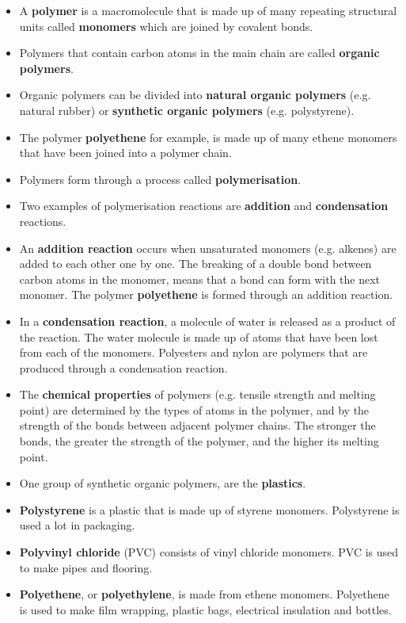 \begin{itemize}
\item{A \textbf{polymer} is a macromolecule that is made up of many repeating structural units called \textbf{monomers} which are joined by covalent bonds.}
\item{Polymers that contain carbon atoms in the main chain are called \textbf{organic polymers}.}
\item{Organic polymers can be divided into \textbf{natural organic polymers} (e.g. natural rubber) or \textbf{synthetic organic polymers} (e.g. polystyrene).}
\item{The polymer \textbf{polyethene} for example, is made up of many ethene monomers that have been joined into a polymer chain.}
\item{Polymers form through a process called \textbf{polymerisation}.}
\item{Two examples of polymerisation reactions are \textbf{addition} and \textbf{condensation} reactions.}
\item{An \textbf{addition reaction} occurs when unsaturated monomers (e.g. alkenes) are added to each other one by one. The breaking of a double bond between carbon atoms in the monomer, means that a bond can form with the next monomer. The polymer \textbf{polyethene} is formed through an addition reaction.}
\item{In a \textbf{condensation reaction}, a molecule of water is released as a product of the reaction. The water molecule is made up of atoms that have been lost from each of the monomers. Polyesters and nylon are polymers that are produced through a condensation reaction.}
\item{The \textbf{chemical properties} of polymers (e.g. tensile strength and melting point) are determined by the types of atoms in the polymer, and by the strength of the bonds between adjacent polymer chains. The stronger the bonds, the greater the strength of the polymer, and the higher its melting point.}
\item{One group of synthetic organic polymers, are the \textbf{plastics}.}
\item{\textbf{Polystyrene} is a plastic that is made up of styrene monomers. Polystyrene is used a lot in packaging.}
\item{\textbf{Polyvinyl chloride} (PVC) consists of vinyl chloride monomers. PVC is used to make pipes and flooring.}
\item{\textbf{Polyethene}, or \textbf{polyethylene}, is made from ethene monomers. Polyethene is used to make film wrapping, plastic bags, electrical insulation and bottles.}

\end{itemize}
